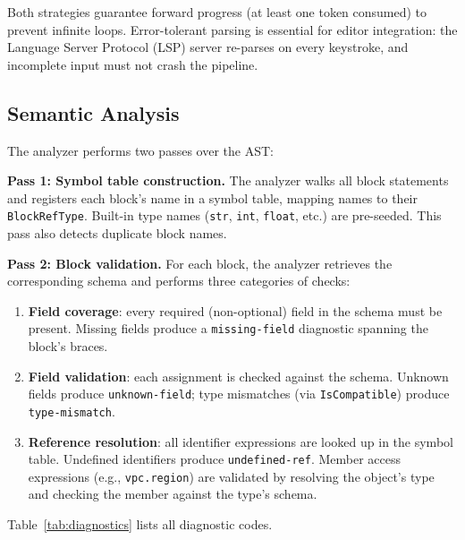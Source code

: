 \documentclass[sigconf,nonacm]{acmart}
\begin{document}
Both strategies guarantee forward progress (at least one token consumed)
to prevent infinite loops. Error-tolerant parsing is essential for
editor integration: the Language Server Protocol (LSP) server
re-parses on every keystroke, and incomplete input must not crash the
pipeline.

\subsection{Semantic Analysis}
\label{sec:compiler:analyzer}

The analyzer performs two passes over the AST:

\noindent\textbf{Pass 1: Symbol table construction.} The analyzer walks
all block statements and registers each block's name in a symbol table,
mapping names to their \texttt{BlockRefType}. Built-in type names
(\texttt{str}, \texttt{int}, \texttt{float}, etc.) are pre-seeded. This
pass also detects duplicate block names.

\noindent\textbf{Pass 2: Block validation.} For each block, the analyzer
retrieves the corresponding schema and performs three categories of checks:

\begin{enumerate}[leftmargin=*]
  \item \textbf{Field coverage}: every required (non-optional) field in the
        schema must be present. Missing fields produce a
        \texttt{missing-field} diagnostic spanning the block's braces.
  \item \textbf{Field validation}: each assignment is checked against the
        schema. Unknown fields produce \texttt{unknown-field}; type
        mismatches (via \texttt{IsCompatible}) produce \texttt{type-mismatch}.
  \item \textbf{Reference resolution}: all identifier expressions are
        looked up in the symbol table. Undefined identifiers produce
        \texttt{undefined-ref}. Member access expressions (e.g.,
        \texttt{vpc.region}) are validated by resolving the object's type
        and checking the member against the type's schema.
\end{enumerate}

Table~\ref{tab:diagnostics} lists all diagnostic codes.
\end{document}
